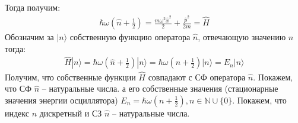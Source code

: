 \documentclass[__main__.tex]{subfiles}
\begin{document}
Тогда получим:
\begin{gather*}
	\hbar\omega\left(\hat{n}+\frac{1}{2}\right)
	=
	\frac{m\omega^2\hat{x}^2}{2}+\frac{\hat{p}^2}{2m}
	=
	\hat{H}
\end{gather*}
Обозначим за $|n\rangle$ собственную функцию оператора $\hat{n}$, отвечающую значению $n$ тогда:
\begin{gather*}
	\hat{H}|n\rangle
	=
	\hbar\omega\left(\hat{n}+\frac{1}{2}\right)|n\rangle
	=
	\hbar\omega\left(n+\frac{1}{2}\right)|n\rangle
	=
	E_n|n\rangle
\end{gather*}
Получим, что собственные функции $\hat{H}$ совпадают с СФ оператора $\hat{n}$. Покажем, что СФ $\hat{n}$ -- натуральные числа. а его собственные значения (стационарные значения энергии осциллятора) $E_n=\hbar\omega\left(n+\frac{1}{2}\right),n\in\mathbb{N}\cup\{0\}$. Покажем, что индекс $n$ дискретный и СЗ $\hat{n}$ -- натуральные числа.
\end{document}
